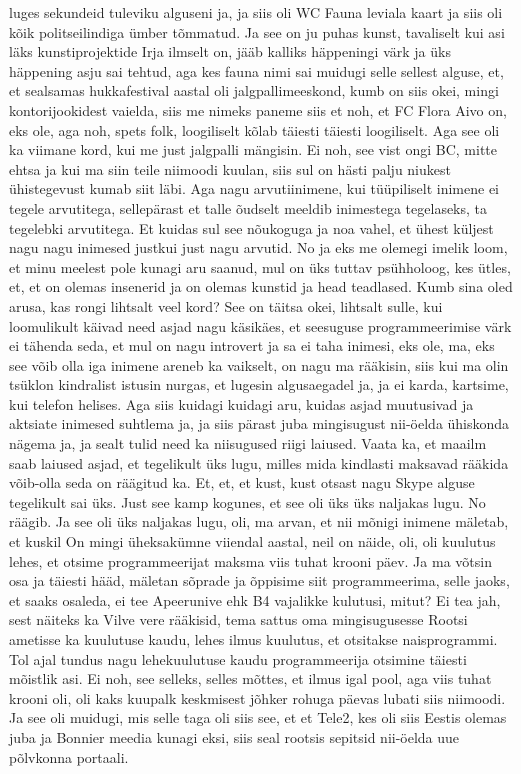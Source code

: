 luges sekundeid tuleviku alguseni ja, ja siis oli WC Fauna leviala kaart ja siis oli kõik politseilindiga ümber tõmmatud. Ja see on ju puhas kunst, tavaliselt kui asi läks kunstiprojektide Irja ilmselt on, jääb kalliks häppeningi värk ja üks häppening asju sai tehtud, aga kes fauna nimi sai muidugi selle sellest alguse, et, et sealsamas hukkafestival aastal oli jalgpallimeeskond, kumb on siis okei, mingi kontorijookidest vaielda, siis me nimeks paneme siis et noh, et FC Flora Aivo on, eks ole, aga noh, spets folk, loogiliselt kõlab täiesti täiesti loogiliselt. Aga see oli ka viimane kord, kui me just jalgpalli mängisin. Ei noh, see vist ongi BC, mitte ehtsa ja kui ma siin teile niimoodi kuulan, siis sul on hästi palju niukest ühistegevust kumab siit läbi. Aga nagu arvutiinimene, kui tüüpiliselt inimene ei tegele arvutitega, sellepärast et talle õudselt meeldib inimestega tegelaseks, ta tegelebki arvutitega. Et kuidas sul see nõukoguga ja noa vahel, et ühest küljest nagu nagu inimesed justkui just nagu arvutid. No ja eks me olemegi imelik loom, et minu meelest pole kunagi aru saanud, mul on üks tuttav psühholoog, kes ütles, et, et on olemas insenerid ja on olemas kunstid ja head teadlased. Kumb sina oled arusa, kas rongi lihtsalt veel kord? See on täitsa okei, lihtsalt sulle, kui loomulikult käivad need asjad nagu käsikäes, et seesuguse programmeerimise värk ei tähenda seda, et mul on nagu introvert ja sa ei taha inimesi, eks ole, ma, eks see võib olla iga inimene areneb ka vaikselt, on nagu ma rääkisin, siis kui ma olin tsüklon kindralist istusin nurgas, et lugesin algusaegadel ja, ja ei karda, kartsime, kui telefon helises. Aga siis kuidagi kuidagi aru, kuidas asjad muutusivad ja aktsiate inimesed suhtlema ja, ja siis pärast juba mingisugust nii-öelda ühiskonda nägema ja, ja sealt tulid need ka niisugused riigi laiused. Vaata ka, et maailm saab laiused asjad, et tegelikult üks lugu, milles mida kindlasti maksavad rääkida võib-olla seda on räägitud ka. Et, et, et kust, kust otsast nagu Skype alguse tegelikult sai üks. Just see kamp kogunes, et see oli üks üks naljakas lugu. No räägib. Ja see oli üks naljakas lugu, oli, ma arvan, et nii mõnigi inimene mäletab, et kuskil
On mingi üheksakümne viiendal aastal, neil on näide, oli, oli kuulutus lehes, et otsime programmeerijat maksma viis tuhat krooni päev. Ja ma võtsin osa ja täiesti hääd, mäletan sõprade ja õppisime siit programmeerima, selle jaoks, et saaks osaleda, ei tee Apeerunive ehk B4 vajalikke kulutusi, mitut? Ei tea jah, sest näiteks ka Vilve vere rääkisid, tema sattus oma mingisugusesse Rootsi ametisse ka kuulutuse kaudu, lehes ilmus kuulutus, et otsitakse naisprogrammi. Tol ajal tundus nagu lehekuulutuse kaudu programmeerija otsimine täiesti mõistlik asi. Ei noh, see selleks, selles mõttes, et ilmus igal pool, aga viis tuhat krooni oli, oli kaks kuupalk keskmisest jõhker rohuga päevas lubati siis niimoodi. Ja see oli muidugi, mis selle taga oli siis see, et et Tele2, kes oli siis Eestis olemas juba ja Bonnier meedia kunagi eksi, siis seal rootsis sepitsid nii-öelda uue põlvkonna portaali.
